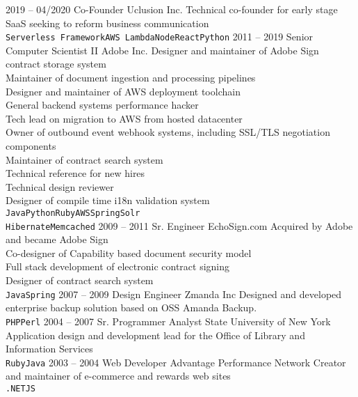 \documentclass[9pt]{developercv} %
\begin{document}
\begin{entrylist}
	\entry
		{2019 -- 04/2020}
		{Co-Founder}
		{Uclusion Inc.}
	        {Technical co-founder for early stage SaaS seeking to reform business communication\\

		\texttt{Serverless Framework}\slashsep\texttt{AWS Lambda}\slashsep\texttt{Node}\slashsep\texttt{React}\slashsep\texttt{Python}}
	\entry
		{2011 -- 2019}
		{Senior Computer Scientist II}
		{Adobe Inc.}
                {Designer and maintainer of Adobe Sign contract storage system\\
                Maintainer of document ingestion and processing pipelines\\
                Designer and maintainer of AWS deployment toolchain\\
                General backend systems performance hacker\\
                Tech lead on migration to AWS from hosted datacenter\\
                Owner of outbound event webhook systems, including SSL/TLS negotiation components\\
                Maintainer of contract search system\\
                Technical reference for new hires\\
                Technical design reviewer\\
                Designer of compile time i18n validation system \\
		\texttt{Java}\slashsep\texttt{Python}\slashsep\texttt{Ruby}\slashsep\texttt{AWS}\slashsep\texttt{Spring}\slashsep\texttt{Solr}\\
                \texttt{Hibernate}\slashsep\texttt{Memcached}
                }
	\entry
		{2009 -- 2011}
		{Sr. Engineer}
		{EchoSign.com}
                {Acquired by Adobe and became Adobe Sign\\
                  Co-designer of Capability based document security model\\
                  Full stack development of electronic contract signing \\
                  Designer of contract search system \\
		\texttt{Java}\slashsep\texttt{Spring}}
	\entry
		{2007 -- 2009}
		{Design Engineer}
		{Zmanda Inc}
                {Designed and developed enterprise backup solution based on OSS Amanda Backup.\\
		\texttt{PHP}\slashsep\texttt{Perl}}
	\entry
		{2004 -- 2007}
		{Sr. Programmer Analyst}
		{State University of New York}
                {Application design and development lead for the Office of Library and Information Services\\
		\texttt{Ruby}\slashsep\texttt{Java}}
	\entry
		{2003 -- 2004}
		{Web Developer}
		{Advantage Performance Network}
                {Creator and maintainer of e-commerce and rewards web sites\\
		\texttt{.NET}\slashsep\texttt{JS}}
\end{entrylist}
\clearpage
\end{document}
